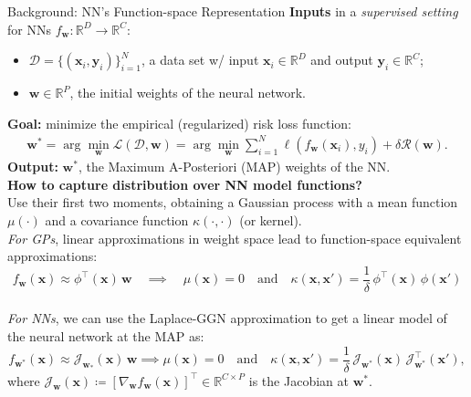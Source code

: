 \documentclass[final,12pt]{beamer}
\newcommand{\mbf}[1]{\mathbf{#1}}
\newcommand{\dataset}{\ensuremath{\mathcal{D}}}
\newcommand{\inputDomain}{\ensuremath{\mathbb{R}^{D}}}
\newcommand{\outputDomain}{\ensuremath{\mathbb{R}^{C}}}
\newcommand{\weights}{\ensuremath{\mathbf{w}}}
\newcommand{\T}{\top}
\newcommand{\vx}{\mbf{x}}
\newcommand{\vy}{\mbf{y}}
\newcommand{\vw}{\mbf{w}}
\newcommand{\Jac}[2]{\mathcal{J}_{#1}(#2)}
\newcommand{\JacT}[2]{\mathcal{J}_{#1}^\top(#2)}
\newcommand{\R}{\mathbb{R}}
\newlength{\colwidth}
\begin{document}
\begin{frame}[t]
\begin{columns}[t]
\begin{column}{\colwidth}
  \begin{block}{Background: NN's Function-space Representation}
  \alert{\bf Inputs} in a {\it supervised setting} for NNs $f_\mathbf{w}: \inputDomain \to \outputDomain$:\
  \begin{itemize}
  \item $\dataset = \{(\vx_{i} , \vy_{i})\}_{i=1}^{N}$, a data set w/ input $\vx_i \in \inputDomain$ and output $\vy_i \in \outputDomain$;
  \item $\weights \in \R^{P}$, the initial weights of the neural network.
  \end{itemize}
\alert{\bf Goal: }
  minimize the empirical (regularized) risk loss function:
\begin{align} 
  \weights^{*} =  \arg \min_{\weights} \mathcal{L}(\dataset,\weights) \nonumber
     = \arg \min_{\weights} \textstyle\sum_{i=1}^{N} \ell(f_\weights(\mathbf{x}_{i}), y_i) + \delta \mathcal{R}(\weights).
 \end{align}
\alert{\bf Output:} $\weights^*$, the Maximum A-Posteriori (MAP) weights of the NN.\\[0.5cm]

\alert{\bf How to capture distribution over NN model functions?}	\\
Use their first two moments, obtaining a Gaussian process with a \alert{mean function $\mu(\cdot)$} and a \alert{covariance function $\kappa(\cdot,\cdot)$} (or kernel). \\
{\it For GPs}, linear approximations in weight space lead to function-space equivalent approximations:
\begin{equation*}
	f_\weights(\vx) \approx 
\phi^\top\!(\vx) \, \vw \quad\implies\quad \mu(\vx) = 0 \quad \text{and} \quad \kappa(\vx, \vx') = \frac{1}{\delta} \, \phi^\T\!(\vx) \, \phi(\vx')
\end{equation*}\\
{\it For NNs}, we can use the \alert{Laplace-GGN approximation} to get a linear model of the neural network at the MAP as:
\begin{equation*}
	f_{\weights^*}(\vx) \approx \Jac{\weights_*}{\vx} \, \weights \implies   \mu(\vx) =  0 \quad \text{and} \quad
  \kappa(\vx, \vx')
  = \frac{1}{\delta} \, \Jac{\weights^*}{\vx} \, \JacT{\weights^*}{\vx'}, 
\end{equation*}
where $\Jac{\weights}{\vx} \coloneqq \left[ \nabla_\weights f_\weights(\vx)\right]^\top \in \R^{C \times P}$ is the Jacobian at $\weights^*$.
\end{block}
\end{column}


\end{columns}
\end{frame}
\end{document}
